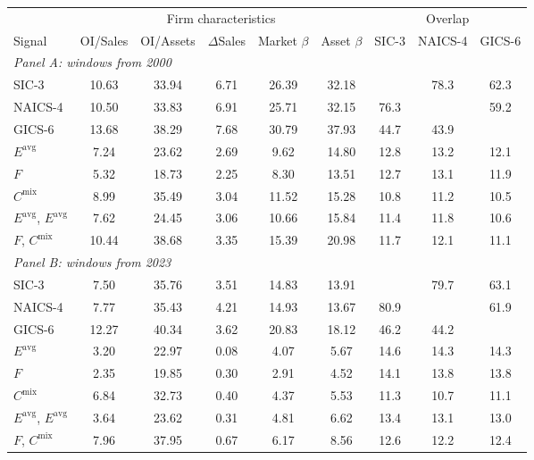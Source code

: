 \begin{table}[htbp]
{\footnotesize
\begin{adjustbox}{max width=\linewidth, max totalheight=0.75\textheight}
\begin{tabular}{lcccccccc}
\toprule
 & \multicolumn{5}{c}{Firm characteristics} & \multicolumn{3}{c}{Overlap} \\
\cmidrule(lr){2-6} \cmidrule(lr){7-9}
Signal & OI/Sales & OI/Assets & $\Delta$Sales & Market $\beta$ & Asset $\beta$ & SIC-3 & NAICS-4 & GICS-6 \\
\midrule
\multicolumn{9}{l}{\textit{Panel A: windows from 2000}} \\
SIC-3 & 10.63 & 33.94 & 6.71 & 26.39 & 32.18 &  & 78.3 & 62.3 \\
NAICS-4 & 10.50 & 33.83 & 6.91 & 25.71 & 32.15 & 76.3 &  & 59.2 \\
GICS-6 & 13.68 & 38.29 & 7.68 & 30.79 & 37.93 & 44.7 & 43.9 &  \\
$E^{\mathrm{avg}}$ & \phantom{0}7.24 & 23.62 & 2.69 & \phantom{0}9.62 & 14.80 & 12.8 & 13.2 & 12.1 \\
$F$ & \phantom{0}5.32 & 18.73 & 2.25 & \phantom{0}8.30 & 13.51 & 12.7 & 13.1 & 11.9 \\
$C^{\mathrm{mix}}$ & \phantom{0}8.99 & 35.49 & 3.04 & 11.52 & 15.28 & 10.8 & 11.2 & 10.5 \\
$E^{\mathrm{avg}}$, $E^{\mathrm{avg}}$ & \phantom{0}7.62 & 24.45 & 3.06 & 10.66 & 15.84 & 11.4 & 11.8 & 10.6 \\
$F$, $C^{\mathrm{mix}}$ & 10.44 & 38.68 & 3.35 & 15.39 & 20.98 & 11.7 & 12.1 & 11.1 \\
\midrule
\multicolumn{9}{l}{\textit{Panel B: windows from 2023}} \\
SIC-3 & \phantom{0}7.50 & 35.76 & 3.51 & 14.83 & 13.91 &  & 79.7 & 63.1 \\
NAICS-4 & \phantom{0}7.77 & 35.43 & 4.21 & 14.93 & 13.67 & 80.9 &  & 61.9 \\
GICS-6 & 12.27 & 40.34 & 3.62 & 20.83 & 18.12 & 46.2 & 44.2 &  \\
$E^{\mathrm{avg}}$ & \phantom{0}3.20 & 22.97 & 0.08 & \phantom{0}4.07 & \phantom{0}5.67 & 14.6 & 14.3 & 14.3 \\
$F$ & \phantom{0}2.35 & 19.85 & 0.30 & \phantom{0}2.91 & \phantom{0}4.52 & 14.1 & 13.8 & 13.8 \\
$C^{\mathrm{mix}}$ & \phantom{0}6.84 & 32.73 & 0.40 & \phantom{0}4.37 & \phantom{0}5.53 & 11.3 & 10.7 & 11.1 \\
$E^{\mathrm{avg}}$, $E^{\mathrm{avg}}$ & \phantom{0}3.64 & 23.62 & 0.31 & \phantom{0}4.81 & \phantom{0}6.62 & 13.4 & 13.1 & 13.0 \\
$F$, $C^{\mathrm{mix}}$ & \phantom{0}7.96 & 37.95 & 0.67 & \phantom{0}6.17 & \phantom{0}8.56 & 12.6 & 12.2 & 12.4 \\
\bottomrule
\end{tabular}
\end{adjustbox}
}
\end{table}
